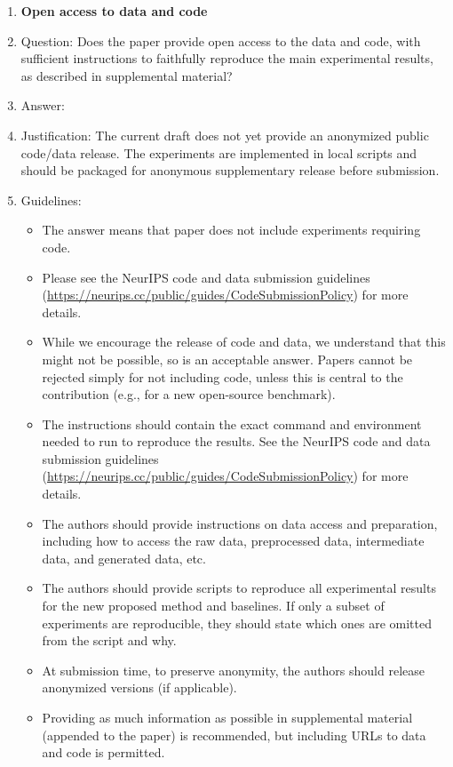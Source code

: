 \begin{enumerate}
\item {\bf Open access to data and code}
    \item[] Question: Does the paper provide open access to the data and code, with sufficient instructions to faithfully reproduce the main experimental results, as described in supplemental material?
    \item[] Answer: \answerNo{}
    \item[] Justification: The current draft does not yet provide an anonymized public code/data release. The experiments are implemented in local scripts and should be packaged for anonymous supplementary release before submission.
    \item[] Guidelines:
    \begin{itemize}
        \item The answer \answerNA{} means that paper does not include experiments requiring code.
        \item Please see the NeurIPS code and data submission guidelines (\url{https://neurips.cc/public/guides/CodeSubmissionPolicy}) for more details.
        \item While we encourage the release of code and data, we understand that this might not be possible, so \answerNo{} is an acceptable answer. Papers cannot be rejected simply for not including code, unless this is central to the contribution (e.g., for a new open-source benchmark).
        \item The instructions should contain the exact command and environment needed to run to reproduce the results. See the NeurIPS code and data submission guidelines (\url{https://neurips.cc/public/guides/CodeSubmissionPolicy}) for more details.
        \item The authors should provide instructions on data access and preparation, including how to access the raw data, preprocessed data, intermediate data, and generated data, etc.
        \item The authors should provide scripts to reproduce all experimental results for the new proposed method and baselines. If only a subset of experiments are reproducible, they should state which ones are omitted from the script and why.
        \item At submission time, to preserve anonymity, the authors should release anonymized versions (if applicable).
        \item Providing as much information as possible in supplemental material (appended to the paper) is recommended, but including URLs to data and code is permitted.
    \end{itemize}



\end{enumerate}
